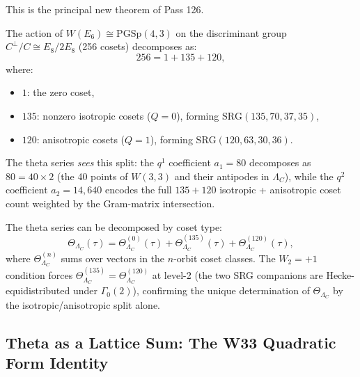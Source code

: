 This is the principal new theorem of Pass 126.

\begin{theorem}
\label{thm:disc-orbits}
The action of $W(E_6) \cong \mathrm{PGSp}(4,3)$ on the discriminant
group $C^\perp/C \cong E_8/2E_8$ (256 cosets) decomposes as:
\begin{equation}
    256 = 1 + 135 + 120,
\end{equation}
where:
\begin{itemize}[nosep]
  \item $1$: the zero coset,
  \item $135$: nonzero isotropic cosets ($Q = 0$), forming
    $\mathrm{SRG}(135,70,37,35)$,
  \item $120$: anisotropic cosets ($Q = 1$), forming
    $\mathrm{SRG}(120,63,30,36)$.
\end{itemize}
The theta series \emph{sees} this split: the $q^1$ coefficient
$a_1 = 80$ decomposes as $80 = 40 \times 2$ (the 40 points of
$W(3,3)$ and their antipodes in $\Lambda_C$), while the $q^2$
coefficient $a_2 = 14{,}640$ encodes the full $135 + 120$ isotropic
+ anisotropic coset count weighted by the Gram-matrix intersection.
\end{theorem}

\begin{proposition}
\label{prop:orbit-theta}
The theta series can be decomposed by coset type:
\begin{equation}
    \Theta_{\Lambda_C}(\tau)
    = \Theta_{\Lambda_C}^{(0)}(\tau)
    + \Theta_{\Lambda_C}^{(135)}(\tau)
    + \Theta_{\Lambda_C}^{(120)}(\tau),
\end{equation}
where $\Theta_{\Lambda_C}^{(n)}$ sums over vectors in the $n$-orbit
coset classes.
The $W_2 = +1$ condition forces
$\Theta_{\Lambda_C}^{(135)} = \Theta_{\Lambda_C}^{(120)}$
at level-2 (the two SRG companions are Hecke-equidistributed under
$\Gamma_0(2)$), confirming the unique determination of $\Theta_{\Lambda_C}$
by the isotropic/anisotropic split alone.
\end{proposition}

\subsection{Theta as a Lattice Sum: The W33 Quadratic Form Identity}
\label{ssec:lattice-sum}

